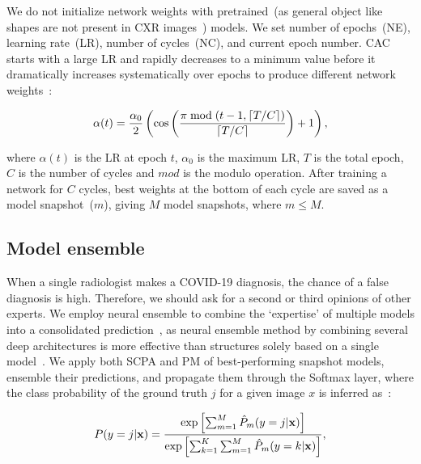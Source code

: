 \documentclass[conference]{IEEEtran}
\begin{document}
\fi
We do not initialize network weights with pretrained~(as general object like shapes are not present in CXR images~\cite{karimdeepcovidexplainer}) models. We set number of epochs~(NE), learning rate~(LR), number of cycles~(NC), and current epoch number. CAC starts with a large LR and rapidly decreases to a minimum value before it dramatically increases systematically over epochs to produce different network weights~\cite{huang2017snapshot}: 

\vspace{-2mm}
\begin{equation}
    \label{eq:lr-cosine}
    \scriptsize{
    \alpha(t)=\frac{\alpha_{0}}{2}\left(\cos \left(\frac{\pi \bmod (t-1,\lceil T / C\rceil)}{\lceil T / C\rceil}\right)+1\right),}
\end{equation}

where $\alpha(t)$ is the LR at epoch $t$, $\alpha_0$ is the maximum LR, $T$ is the total epoch, $C$ is the number of cycles and $mod$ is the modulo operation. After training a network for $C$ cycles, best weights at the bottom of each cycle are saved as a model snapshot~($m$), giving $M$ model snapshots, where $m \leq M$. 

\subsection{Model ensemble}
When a single radiologist makes a COVID-19 diagnosis, the chance of a false diagnosis is high. Therefore, we should ask for a second or third opinions of other experts. %
We employ neural ensemble to combine the `expertise' of multiple models into a consolidated prediction~\cite{huang2017snapshot}, as neural ensemble method by combining several deep architectures is more effective than structures solely based on a single model~\cite{huang2017snapshot,karim2019snapshot}. 
We apply both SCPA and PM of best-performing snapshot models, ensemble their predictions, and propagate them through the Softmax layer, where the class probability of the ground truth $j$ for a given image $x$ is inferred as~\cite{7}:

\vspace{-2mm}
\begin{equation}
\scriptsize{
    P(y=j | \mathbf{x})=\frac{\exp \left[\sum_{m=1}^{M} \hat{P}_{m}(y=j | \mathbf{x})\right]}{\exp \left[\sum_{k=1}^{K} \sum_{m=1}^{M} \hat{P}_{m}(y=k | \mathbf{x})\right]},}
\end{equation}
\end{document}
